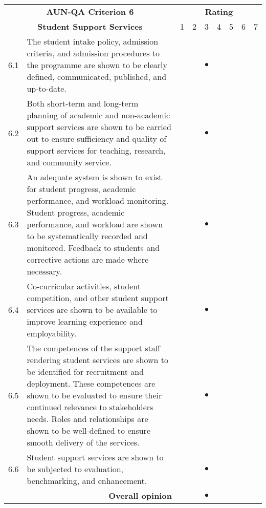 \begin{longtable}{|c| p{}|p{0.3cm}|p{0.3cm}|c|p{0.3cm}|p{0.3cm}|p{0.3cm}|p{0.3cm}|}
	\hline
	\multicolumn{2}{|c|}{\bf AUN-QA Criterion 6}&\multicolumn{7}{c|}{\bf Rating}\\\cline{3-9}
	\multicolumn{2}{|c|}{\bf Student Support Services}&1&2&3&4&5&6&7\\\hline
	\endhead

6.1&The student intake policy, admission criteria, and admission procedures to the programme are shown to be clearly defined, communicated, published, and
up-to-date.&&& {\huge{$\bullet$}}&&&&\\\hline

6.2&Both short-term and long-term planning of academic and non-academic support services are shown to be carried out to ensure sufficiency and quality of support services for teaching, research, and community service.&&& {\huge{$\bullet$}}&&&&\\\hline

6.3&An adequate system is shown to exist for student progress, academic performance, and workload monitoring. Student progress, academic performance, and workload are shown to be systematically recorded and monitored. Feedback to students and corrective actions are made where necessary.&&& {\huge{$\bullet$}}&&&&\\\hline

6.4&Co-curricular activities, student competition, and other student support services are shown to be available to improve learning experience and employability.&&& {\huge{$\bullet$}}&&&&\\\hline

6.5&The competences of the support staff rendering student services are shown to be identified for recruitment and deployment. These competences are shown to be evaluated to ensure their continued relevance to stakeholders needs. Roles and relationships are shown to be well-defined to ensure smooth delivery of the services.&&& {\huge{$\bullet$}}&&&&\\\hline

6.6&Student support services are shown to be subjected to evaluation, benchmarking, and enhancement.&&& {\huge{$\bullet$}}&&&&\\\hline

\multicolumn{2}{|r|}{\bf Overall opinion}&&& {\huge{$\bullet$}}&&&&\\\hline
\end{longtable}


